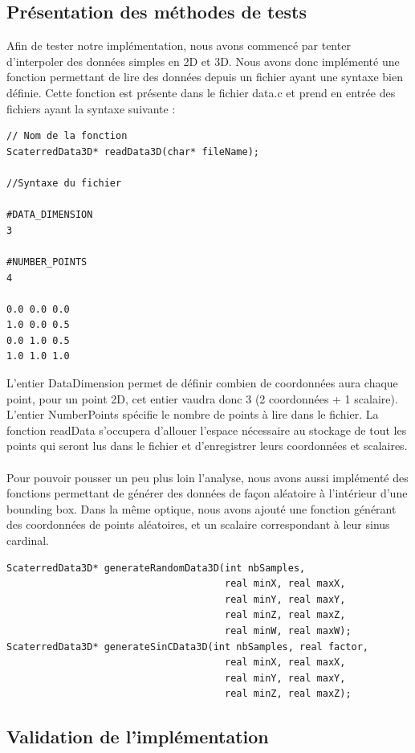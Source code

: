 \documentclass[a4paper,9pt]{article}
\begin{document}
\subsection{Présentation des méthodes de tests}
\label{subsec:presentation_tests}
Afin de tester notre implémentation, nous avons commencé par tenter d'interpoler des données simples en 2D et 3D. Nous avons donc implémenté une fonction permettant de lire des données depuis un fichier ayant une syntaxe bien définie. Cette fonction est présente dans le fichier data.c et prend en entrée des fichiers ayant la syntaxe suivante :
\begin{verbatim}
// Nom de la fonction
ScaterredData3D* readData3D(char* fileName);

//Syntaxe du fichier

#DATA_DIMENSION
3

#NUMBER_POINTS
4

0.0 0.0 0.0
1.0 0.0 0.5
0.0 1.0 0.5
1.0 1.0 1.0
\end{verbatim}
L'entier DataDimension permet de définir combien de coordonnées aura chaque point, pour un point 2D, cet entier vaudra donc 3 (2 coordonnées + 1 scalaire). L'entier NumberPoints spécifie le nombre de points à lire dans le fichier. La fonction readData s'occupera d'allouer l'espace nécessaire au stockage de tout les points qui seront lus dans le fichier et d'enregistrer leurs coordonnées et scalaires.\\\\
Pour pouvoir pousser un peu plus loin l'analyse, nous avons aussi implémenté des fonctions permettant de générer des données de façon aléatoire à l'intérieur d'une bounding box. Dans la même optique, nous avons ajouté une fonction générant des coordonnées de points aléatoires, et un scalaire correspondant à leur sinus cardinal.
\begin{verbatim}
ScaterredData3D* generateRandomData3D(int nbSamples,
                                      real minX, real maxX,
                                      real minY, real maxY,
                                      real minZ, real maxZ,
                                      real minW, real maxW);
ScaterredData3D* generateSinCData3D(int nbSamples, real factor,
                                      real minX, real maxX,
                                      real minY, real maxY,
                                      real minZ, real maxZ);
\end{verbatim} 

\subsection{Validation de l'implémentation}
\label{subsec:validation_implementation}
\end{document}
